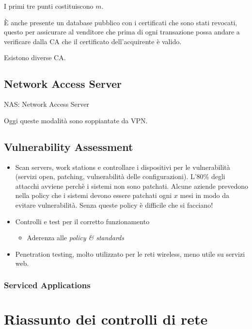 I primi tre punti costituiscono $m$.

È anche presente un database pubblico con i certificati che sono stati revocati, questo per assicurare al venditore che prima di ogni transazione possa andare a verificare dalla CA che il certificato dell'acquirente è valido.

Esistono diverse CA.

\subsection{Network Access Server}

NAS: Network Access Server

Oggi queste modalità sono soppiantate da VPN.


\subsection{Vulnerability Assessment}

\begin{itemize}
\item Scan servers, work stations e controllare i dispositivi per le vulnerabilità (servizi open, patching, vulnerabilità delle configurazioni). L'80\% degli attacchi avviene perchè i sistemi non sono patchati. Alcune aziende prevedono nella policy che i sistemi devono essere patchati ogni $x$ mesi in modo da evitare vulnerabilità. Senza queste policy è difficile che si facciano!
\item Controlli e test per il corretto funzionamento
\begin{itemize}
 \item Aderenza alle \textit{policy \& standards}
\end{itemize}
\item Penetration testing, molto utilizzato per le reti wireless, meno utile su servizi web. 
\end{itemize}

\subsubsection{Serviced Applications}


\section{Riassunto dei controlli di rete}

